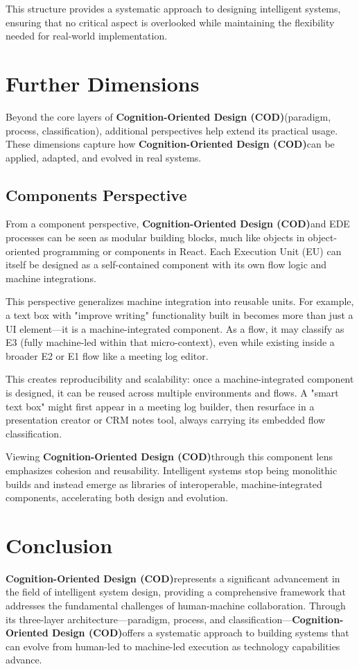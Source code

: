 \documentclass[12pt,a4paper]{article}
\newcommand{\cod}{\textbf{Cognition-Oriented Design (COD)}}
\begin{document}
This structure provides a systematic approach to designing intelligent systems, ensuring that no critical aspect is overlooked while maintaining the flexibility needed for real-world implementation.

\section{Further Dimensions}

Beyond the core layers of \cod (paradigm, process, classification), additional perspectives help extend its practical usage. These dimensions capture how \cod can be applied, adapted, and evolved in real systems.

\subsection{Components Perspective}

From a component perspective, \cod and EDE processes can be seen as modular building blocks, much like objects in object-oriented programming or components in React. Each Execution Unit (EU) can itself be designed as a self-contained component with its own flow logic and machine integrations.

This perspective generalizes machine integration into reusable units. For example, a text box with "improve writing" functionality built in becomes more than just a UI element—it is a machine-integrated component. As a flow, it may classify as E3 (fully machine-led within that micro-context), even while existing inside a broader E2 or E1 flow like a meeting log editor.

This creates reproducibility and scalability: once a machine-integrated component is designed, it can be reused across multiple environments and flows. A "smart text box" might first appear in a meeting log builder, then resurface in a presentation creator or CRM notes tool, always carrying its embedded flow classification.

Viewing \cod through this component lens emphasizes cohesion and reusability. Intelligent systems stop being monolithic builds and instead emerge as libraries of interoperable, machine-integrated components, accelerating both design and evolution.

\section{Conclusion}

\cod represents a significant advancement in the field of intelligent system design, providing a comprehensive framework that addresses the fundamental challenges of human-machine collaboration. Through its three-layer architecture—paradigm, process, and classification—\cod offers a systematic approach to building systems that can evolve from human-led to machine-led execution as technology capabilities advance.
\end{document}
